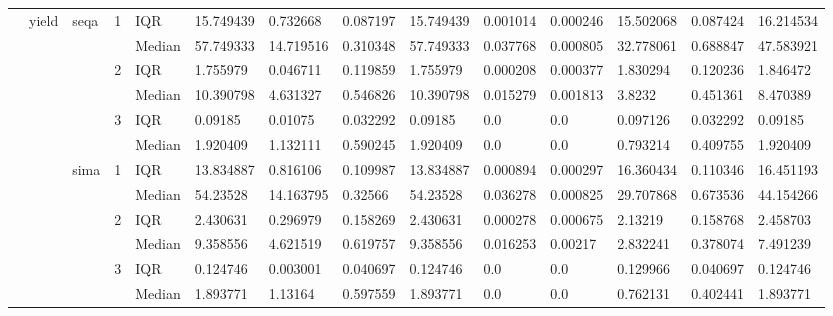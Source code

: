 \begin{tabular}{llllllllllllll}
    & yield & seqa & 1 & IQR &  15.749439 &   0.732668 &  0.087197 &  15.749439 &  0.001014 &  0.000246 &  15.502068 &  0.087424 &  16.214534 \\
    &       &      &   & Median &  57.749333 &  14.719516 &  0.310348 &  57.749333 &  0.037768 &  0.000805 &  32.778061 &  0.688847 &  47.583921 \\
    &       &      & 2 & IQR &   1.755979 &   0.046711 &  0.119859 &   1.755979 &  0.000208 &  0.000377 &   1.830294 &  0.120236 &   1.846472 \\
    &       &      &   & Median &  10.390798 &   4.631327 &  0.546826 &  10.390798 &  0.015279 &  0.001813 &     3.8232 &  0.451361 &   8.470389 \\
    &       &      & 3 & IQR &    0.09185 &    0.01075 &  0.032292 &    0.09185 &       0.0 &       0.0 &   0.097126 &  0.032292 &    0.09185 \\
    &       &      &   & Median &   1.920409 &   1.132111 &  0.590245 &   1.920409 &       0.0 &       0.0 &   0.793214 &  0.409755 &   1.920409 \\
    &       & sima & 1 & IQR &  13.834887 &   0.816106 &  0.109987 &  13.834887 &  0.000894 &  0.000297 &  16.360434 &  0.110346 &  16.451193 \\
    &       &      &   & Median &   54.23528 &  14.163795 &   0.32566 &   54.23528 &  0.036278 &  0.000825 &  29.707868 &  0.673536 &  44.154266 \\
    &       &      & 2 & IQR &   2.430631 &   0.296979 &  0.158269 &   2.430631 &  0.000278 &  0.000675 &    2.13219 &  0.158768 &   2.458703 \\
    &       &      &   & Median &   9.358556 &   4.621519 &  0.619757 &   9.358556 &  0.016253 &   0.00217 &   2.832241 &  0.378074 &   7.491239 \\
    &       &      & 3 & IQR &   0.124746 &   0.003001 &  0.040697 &   0.124746 &       0.0 &       0.0 &   0.129966 &  0.040697 &   0.124746 \\
    &       &      &   & Median &   1.893771 &    1.13164 &  0.597559 &   1.893771 &       0.0 &       0.0 &   0.762131 &  0.402441 &   1.893771 \\
\bottomrule
\end{tabular}
